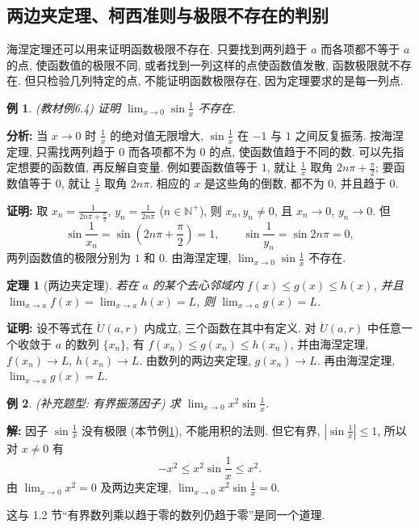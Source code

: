 \documentclass[UTF8,openany]{ctexbook}
\theoremstyle{chinesetextbook}
\newtheorem{example}{例}[section]
\newtheorem{theorem}{定理}[section]
\newenvironment{cnproof}{\par\indent\textbf{证明:} \ignorespaces}{\par}
\newenvironment{cnsolution}{\par\indent\textbf{解:} \ignorespaces}{\par}
\begin{document}
\subsection{两边夹定理、柯西准则与极限不存在的判别}
海涅定理还可以用来证明函数极限不存在. 只要找到两列趋于 $a$ 而各项都不等于 $a$ 的点, 使函数值的极限不同, 或者找到一列这样的点使函数值发散, 函数极限就不存在. 但只检验几列特定的点, 不能证明函数极限存在, 因为定理要求的是每一列点.
\begin{example}\label{ex:6-4}
\textnormal{(教材例6.4)} 证明 $\displaystyle\lim_{x\to0}\sin\frac1x$ 不存在.
\end{example}
\par\indent\textbf{分析:} 当 $x\to0$ 时 $\displaystyle\frac1x$ 的绝对值无限增大, $\displaystyle\sin\frac1x$ 在 $-1$ 与 $1$ 之间反复振荡. 按海涅定理, 只需找两列趋于 $0$ 而各项都不为 $0$ 的点, 使函数值趋于不同的数. 可以先指定想要的函数值, 再反解自变量. 例如要函数值等于 $1$, 就让 $\displaystyle\frac1x$ 取角 $\displaystyle2n\pi+\frac\pi2$; 要函数值等于 $0$, 就让 $\displaystyle\frac1x$ 取角 $2n\pi$. 相应的 $x$ 是这些角的倒数, 都不为 $0$, 并且趋于 $0$.
\begin{cnproof}
取 $\displaystyle x_n=\frac1{2n\pi+\frac\pi2}$, $\displaystyle y_n=\frac1{2n\pi}$ ($n\in\mathbb N^+$), 则 $x_n,y_n\ne0$, 且 $x_n\to0$, $y_n\to0$. 但
\[
\sin\frac1{x_n}=\sin\left(2n\pi+\frac\pi2\right)=1,\qquad\sin\frac1{y_n}=\sin2n\pi=0,
\]
两列函数值的极限分别为 $1$ 和 $0$. 由海涅定理, $\displaystyle\lim_{x\to0}\sin\frac1x$ 不存在.
\end{cnproof}
\begin{theorem}[两边夹定理]
若在 $a$ 的某个去心邻域内 $f(x)\le g(x)\le h(x)$, 并且 $\displaystyle\lim_{x\to a}f(x)=\lim_{x\to a}h(x)=L$, 则 $\displaystyle\lim_{x\to a}g(x)=L$.
\end{theorem}
\begin{cnproof}
设不等式在 $\mathring U(a,r)$ 内成立, 三个函数在其中有定义. 对 $\mathring U(a,r)$ 中任意一个收敛于 $a$ 的数列 $\{x_n\}$, 有 $f(x_n)\le g(x_n)\le h(x_n)$, 并由海涅定理, $f(x_n)\to L$, $h(x_n)\to L$. 由数列的两边夹定理, $g(x_n)\to L$. 再由海涅定理, $\displaystyle\lim_{x\to a}g(x)=L$.
\end{cnproof}
\begin{example}
\textnormal{(补充题型: 有界振荡因子)} 求 $\displaystyle\lim_{x\to0}x^2\sin\frac1x$.
\end{example}
\begin{cnsolution}
因子 $\displaystyle\sin\frac1x$ 没有极限 (本节例\ref{ex:6-4}), 不能用积的法则. 但它有界, $\displaystyle\left|\sin\frac1x\right|\le1$, 所以对 $x\ne0$ 有
\[
-x^2\le x^2\sin\frac1x\le x^2.
\]
由 $\displaystyle\lim_{x\to0}x^2=0$ 及两边夹定理, $\displaystyle\lim_{x\to0}x^2\sin\frac1x=0$.
\end{cnsolution}
这与 1.2 节“有界数列乘以趋于零的数列仍趋于零”是同一个道理.
\end{document}
